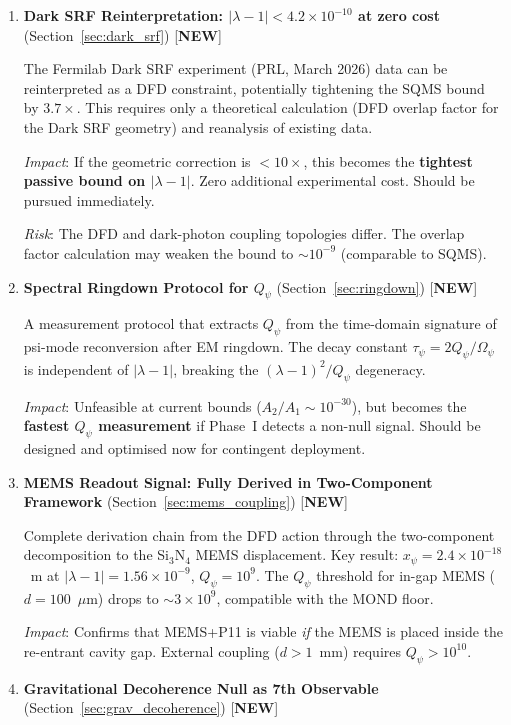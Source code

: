 \documentclass[11pt]{article}
\newcommand{\lam}{\lambda}
\newcommand{\Opsi}{\Omega_\psi}
\newcommand{\ee}[1]{\times 10^{#1}}
\newcommand{\Qpsi}{Q_\psi}
\newcommand{\lbone}{|\lam - 1|}
\theoremstyle{definition}
\theoremstyle{remark}
\begin{document}
\begin{enumerate}

\item \textbf{Dark SRF Reinterpretation: $\lbone < 4.2\ee{-10}$
  at zero cost} (Section~\ref{sec:dark_srf}) [\textbf{NEW}]

The Fermilab Dark SRF experiment (PRL, March 2026) data can be
reinterpreted as a DFD constraint, potentially tightening the
SQMS bound by $3.7\times$. This requires only a theoretical
calculation (DFD overlap factor for the Dark SRF geometry) and
reanalysis of existing data.

\emph{Impact}: If the geometric correction is $<10\times$, this
becomes the \textbf{tightest passive bound on $\lbone$}. Zero
additional experimental cost. Should be pursued immediately.

\emph{Risk}: The DFD and dark-photon coupling topologies differ.
The overlap factor calculation may weaken the bound to $\sim
10^{-9}$ (comparable to SQMS).

\item \textbf{Spectral Ringdown Protocol for $\Qpsi$}
  (Section~\ref{sec:ringdown}) [\textbf{NEW}]

A measurement protocol that extracts $\Qpsi$ from the
time-domain signature of psi-mode reconversion after EM
ringdown. The decay constant $\tau_\psi = 2\Qpsi/\Opsi$
is independent of $\lbone$, breaking the $(\lam-1)^2/\Qpsi$
degeneracy.

\emph{Impact}: Unfeasible at current bounds ($A_2/A_1 \sim 10^{-30}$),
but becomes the \textbf{fastest $\Qpsi$ measurement} if Phase~I
detects a non-null signal. Should be designed and optimised now
for contingent deployment.

\item \textbf{MEMS Readout Signal: Fully Derived in Two-Component
  Framework} (Section~\ref{sec:mems_coupling}) [\textbf{NEW}]

Complete derivation chain from the DFD action through the
two-component decomposition to the Si$_3$N$_4$ MEMS
displacement. Key result: $x_\psi = 2.4\ee{-18}$~m at
$\lbone = 1.56\ee{-9}$, $\Qpsi = 10^9$. The $\Qpsi$ threshold
for in-gap MEMS ($d = 100$~$\mu$m) drops to $\sim 3\ee{9}$,
compatible with the MOND floor.

\emph{Impact}: Confirms that MEMS+P11 is viable \emph{if} the
MEMS is placed inside the re-entrant cavity gap. External coupling
($d > 1$~mm) requires $\Qpsi > 10^{10}$.

\item \textbf{Gravitational Decoherence Null as 7th Observable}
  (Section~\ref{sec:grav_decoherence}) [\textbf{NEW}]


\end{enumerate}
\end{document}
